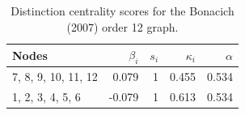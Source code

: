\begin{table}
\centering
\caption{\label{tab:bonacich12}Distinction centrality scores for the Bonacich (2007) order 12 graph.}
\centering
\begin{tabular}[t]{lrrrr}
\toprule
Nodes & $\beta_i$ & $s_i$ & $\kappa_i$ & $\alpha$\\
\midrule
7, 8, 9, 10, 11, 12 & 0.079 & 1 & 0.455 & 0.534\\
1, 2, 3, 4, 5, 6 & -0.079 & 1 & 0.613 & 0.534\\
\bottomrule
\end{tabular}
\end{table}
